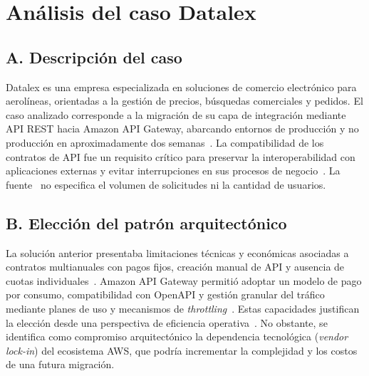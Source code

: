 \documentclass[11pt,a4paper]{article}
\begin{document}
\section*{An\'alisis del caso Datalex}

\subsection*{A. Descripci\'on del caso}
Datalex es una empresa especializada en soluciones de comercio electr\'onico para aerol\'ineas, orientadas a la gesti\'on de precios, b\'usquedas comerciales y pedidos. El caso analizado corresponde a la migraci\'on de su capa de integraci\'on mediante API REST hacia Amazon API Gateway, abarcando entornos de producci\'on y no producci\'on en aproximadamente dos semanas~\cite{prenty2020datalex}. La compatibilidad de los contratos de API fue un requisito cr\'itico para preservar la interoperabilidad con aplicaciones externas y evitar interrupciones en sus procesos de negocio~\cite{prenty2020datalex}. La fuente~\cite{prenty2020datalex} no especifica el volumen de solicitudes ni la cantidad de usuarios.

\subsection*{B. Elecci\'on del patr\'on arquitect\'onico}
La soluci\'on anterior presentaba limitaciones t\'ecnicas y econ\'omicas asociadas a contratos multianuales con pagos fijos, creaci\'on manual de API y ausencia de cuotas individuales~\cite{prenty2020datalex}. Amazon API Gateway permiti\'o adoptar un modelo de pago por consumo, compatibilidad con OpenAPI y gesti\'on granular del tr\'afico mediante planes de uso y mecanismos de \textit{throttling}~\cite{prenty2020datalex}. Estas capacidades justifican la elecci\'on desde una perspectiva de eficiencia operativa~\cite{aydemir2025apigateway,moreira2023age}. No obstante, se identifica como compromiso arquitect\'onico la dependencia tecnol\'ogica (\textit{vendor lock-in}) del ecosistema AWS, que podr\'ia incrementar la complejidad y los costos de una futura migraci\'on.
\end{document}
